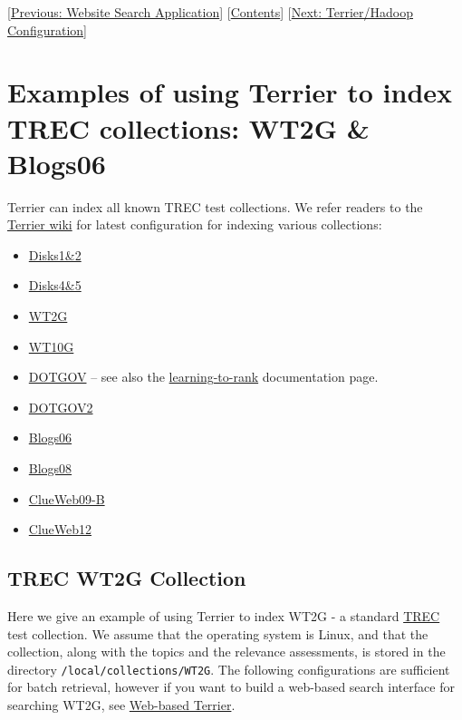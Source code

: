 {[}\href{website_search.html}{Previous: Website Search Application}{]}
{[}\href{index.html}{Contents}{]}
{[}\href{hadoop_configuration.html}{Next: Terrier/Hadoop
Configuration}{]}\\

\section{Examples of using Terrier to index TREC collections: WT2G \&
Blogs06}\label{examples-of-using-terrier-to-index-trec-collections-wt2g-blogs06}

Terrier can index all known TREC test collections. We refer readers to
the \href{http://ir.dcs.gla.ac.uk/wiki/Terrier}{Terrier wiki} for latest
configuration for indexing various collections:

\begin{itemize}
\tightlist
\item
  \href{http://ir.dcs.gla.ac.uk/wiki/Terrier/Disks1\&2}{Disks1\&2}
\item
  \href{http://ir.dcs.gla.ac.uk/wiki/Terrier/Disks4\&5}{Disks4\&5}
\item
  \href{http://ir.dcs.gla.ac.uk/wiki/Terrier/WT2G}{WT2G}
\item
  \href{http://ir.dcs.gla.ac.uk/wiki/Terrier/WT10G}{WT10G}
\item
  \href{http://ir.dcs.gla.ac.uk/wiki/Terrier/DOTGOV}{DOTGOV} -- see also
  the \href{learning.html}{learning-to-rank} documentation page.
\item
  \href{http://ir.dcs.gla.ac.uk/wiki/Terrier/DOTGOV2}{DOTGOV2}
\item
  \href{http://ir.dcs.gla.ac.uk/wiki/Terrier/Blogs06}{Blogs06}
\item
  \href{http://ir.dcs.gla.ac.uk/wiki/Terrier/Blogs08}{Blogs08}
\item
  \href{http://ir.dcs.gla.ac.uk/wiki/Terrier/ClueWeb09-B}{ClueWeb09-B}
\item
  \href{http://ir.dcs.gla.ac.uk/wiki/Terrier/ClueWeb12}{ClueWeb12}
\end{itemize}

\subsection{TREC WT2G Collection}\label{trec-wt2g-collection}

Here we give an example of using Terrier to index WT2G - a standard
\href{http://trec.nist.gov}{TREC} test collection. We assume that the
operating system is Linux, and that the collection, along with the
topics and the relevance assessments, is stored in the directory
\texttt{/local/collections/WT2G}. The following configurations are
sufficient for batch retrieval, however if you want to build a web-based
search interface for searching WT2G, see
\href{terrier_http.html}{Web-based Terrier}.


